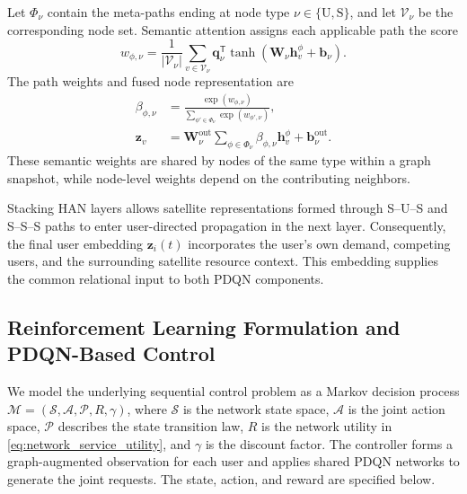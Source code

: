 \documentclass[journal]{IEEEtran}
\begin{document}
Let $\Phi_\nu$ contain the meta-paths ending at node type
$\nu\in\{\mathrm U,\mathrm S\}$, and let $\mathcal{V}_\nu$
be the corresponding node set. Semantic attention assigns
each applicable path the score
\begin{equation}
w_{\phi,\nu}
=
\frac{1}{|\mathcal{V}_\nu|}
\sum_{v\in\mathcal{V}_\nu}
\mathbf{q}_\nu^{\mathsf T}
\tanh\left(
\mathbf{W}_\nu\mathbf{h}_v^\phi+\mathbf{b}_\nu
\right).
\label{eq:han_semantic_score}
\end{equation}
The path weights and fused node representation are
\begin{equation}
\begin{aligned}
\beta_{\phi,\nu}
&=
\frac{\exp(w_{\phi,\nu})}
{\sum_{\phi'\in\Phi_\nu}\exp(w_{\phi',\nu})},\\
\mathbf{z}_v
&=
\mathbf{W}^{\mathrm{out}}_\nu
\sum_{\phi\in\Phi_\nu}
\beta_{\phi,\nu}\mathbf{h}_v^\phi
+\mathbf{b}^{\mathrm{out}}_\nu.
\end{aligned}
\label{eq:han_semantic_fusion}
\end{equation}
These semantic weights are shared by nodes of the same type
within a graph snapshot, while node-level weights depend
on the contributing neighbors.

Stacking HAN layers allows satellite representations formed
through S--U--S and S--S--S paths to enter user-directed
propagation in the next layer. Consequently, the final
user embedding $\mathbf{z}_i(t)$ incorporates the user's
own demand, competing users, and the surrounding satellite
resource context. This embedding supplies the common
relational input to both PDQN components.

\subsection{Reinforcement Learning Formulation and PDQN-Based Control}
\label{subsec:pdqn_joint_control}

We model the underlying sequential control problem as
a Markov decision process
$\mathcal{M}=(\mathcal{S},\mathcal{A},\mathcal{P},R,\gamma)$,
where $\mathcal{S}$ is the network state space,
$\mathcal{A}$ is the joint action space,
$\mathcal{P}$ describes the state transition law,
$R$ is the network utility in
\eqref{eq:network_service_utility}, and $\gamma$ is
the discount factor.
The controller forms a graph-augmented observation
for each user and applies shared PDQN networks
to generate the joint requests.
The state, action, and reward are specified below.
\end{document}
